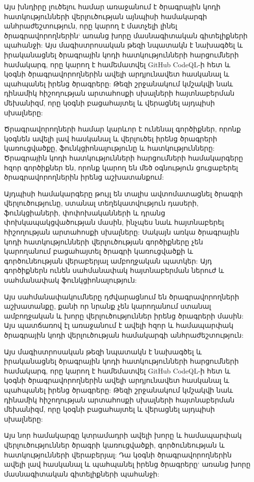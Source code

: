 {    Այս խնդիրը լուծելու համար առաջանում է ծրագրային կոդի հատկությունների վերլուծության այնպիսի համակարգի անհրաժեշտություն, որը կարող է մատչելի լինել ծրագրավորողներին` առանց խորը մասնագիտական գիտելիքների պահանջի: Այս մագիստրոսական թեզի նպատակն է նախագծել և իրականացնել ծրագրային կոդի հատկությունների հարցումների համակարգ, որը կարող է համեմատվել GitHub CodeQL-ի հետ և կօգնի ծրագրավորողներին ավելի արդյունավետ հասկանալ և պահպանել իրենց ծրագրերը: Թեզի շրջանակում կմշակվի նաև դինամիկ հիշողության արտահոսքի սխալների հայտնաբերման մեխանիզմ, որը կօգնի բացահայտել և վերացնել այդպիսի սխալները:

    Ծրագրավորողների համար կարևոր է ունենալ գործիքներ, որոնք կօգնեն ավելի լավ հասկանալ և վերլուծել իրենց ծրագրերի կառուցվածքը, ֆունկցիոնալությունը և հատկությունները: Ծրագրային կոդի հատկությունների հարցումների համակարգերը հզոր գործիքներ են, որոնք կարող են մեծ օգնություն ցուցաբերել ծրագրավորողներին իրենց աշխատանքում:

    Այդպիսի համակարգերը թույլ են տալիս ավտոմատացնել ծրագրի վերլուծությունը, ստանալ տեղեկատվություն դասերի, ֆունկցիաների, փոփոխականների և դրանց փոխկապակցվածության մասին, ինչպես նաև հայտնաբերել հիշողության արտահոսքի սխալները: Սակայն առկա ծրագրային կոդի հատկությունների վերլուծության գործիքները չեն կարողանում բացահայտել ծրագրի կառուցվածքի և գործունեության վերաբերյալ ամբողջական պատկեր: Այդ գործիքներն ունեն սահմանափակ հայտնաբերման ներուժ և սահմանափակ ֆունկցիոնալություն:

    Այս սահմանափակումները դժվարացնում են ծրագրավորողների աշխատանքը, քանի որ նրանք չեն կարողանում ստանալ ամբողջական և խորը վերլուծություններ իրենց ծրագրերի մասին: Այս պատճառով էլ առաջանում է ավելի հզոր և համապարփակ ծրագրային կոդի վերլուծության համակարգի անհրաժեշտություն:

    Այս մագիստրոսական թեզի նպատակն է նախագծել և իրականացնել ծրագրային կոդի հատկությունների հարցումների համակարգ, որը կարող է համեմատվել GitHub CodeQL-ի հետ և կօգնի ծրագրավորողներին ավելի արդյունավետ հասկանալ և պահպանել իրենց ծրագրերը: Թեզի շրջանակում կմշակվի նաև դինամիկ հիշողության արտահոսքի սխալների հայտնաբերման մեխանիզմ, որը կօգնի բացահայտել և վերացնել այդպիսի սխալները:

    Այս նոր համակարգը կտրամադրի ավելի խորը և համապարփակ վերլուծություններ ծրագրի կառուցվածքի, գործունեության և հատկությունների վերաբերյալ: Դա կօգնի ծրագրավորողներին ավելի լավ հասկանալ և պահպանել իրենց ծրագրերը` առանց խորը մասնագիտական գիտելիքների պահանջի:
}